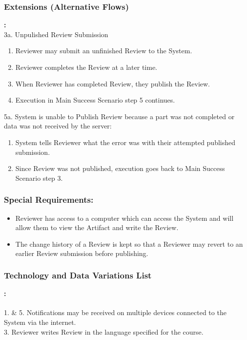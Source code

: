      \subsubsection*{Extensions (Alternative Flows)}\textbf{:}
     \newline
     \\
     3a. Unpulished Review Submission
     \begin{enumerate}
         \itemsep-1em 
        \item Reviewer may submit an unfinished Review to the System.
         \item Reviewer completes the Review at a later time.
         \item When Reviewer has completed Review, they publish the Review.
          \item Execution in Main Success Scenario step 5 continues.
    \end{enumerate}
    5a. System is unable to Publish Review because a part was not completed or data was
not received by the server:
\begin{enumerate}
        \itemsep-1em 
        \item System tells Reviewer what the error was with their attempted published
        submission.
        \item Since Review was not published, execution goes back to Main Success Scenario
         step 3.
    \end{enumerate}


\subsubsection*{Special Requirements:}
    \begin{itemize}
    \itemsep-1em 
       \item Reviewer has access to a computer which can access the System and will allow
         them to view the Artifact and write the Review.
       \item The change history of a Review is kept so that a Reviewer may revert to an earlier Review submission before publishing.
    \end{itemize}
     

     \subsubsection*{Technology and Data Variations List}\textbf{:}
     \\
     \\
     1. \& 5. Notifications may be received on multiple devices connected to the System via
     the internet.
      \\
     3. Reviewer writes Review in the language specified for the course.
     

